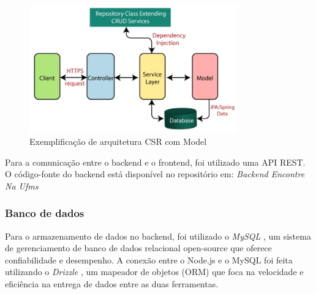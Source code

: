     \begin{figure}[h]
        \centering
        \includegraphics[width=0.8\textwidth]{imagens/csrM.jpg}
        \caption{\scriptsize Exemplificação de arquitetura CSR com Model}
        \footnotesize  {}
        \label{fig:csrModel}
    \end{figure}

    Para a comunicação entre o backend e o frontend, foi utilizado uma API REST. O código-fonte do backend está disponível no repositório em: \textit{Backend Encontre Na Ufms} \cite{backend}

\subsubsection{Banco de dados}
    
    Para o armazenamento de dados no backend, foi utilizado o \textit{MySQL} \cite{mysql}, um sistema de gerenciamento de banco de dados relacional open-source que oferece confiabilidade e desempenho. A conexão entre o Node.js e o MySQL foi feita utilizando o \textit{Drizzle} \cite{drizzle}, um mapeador de objetos (ORM) que foca na velocidade e eficiência na entrega de dados entre as duas ferramentas.

